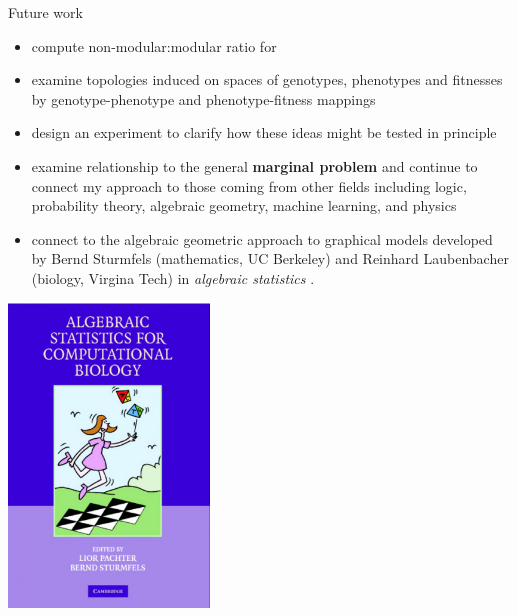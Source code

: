 \begin{frame}
\begin{footnotesize}
\begin{block}{Future work}
\begin{itemize}
\item compute non-modular:modular ratio for
\begin{enumerate}
\end{enumerate}
\item examine topologies induced on spaces of genotypes, phenotypes and fitnesses by genotype-phenotype and phenotype-fitness mappings
\item design an experiment to clarify how these ideas might be tested in principle
\item examine relationship to the general \textbf{marginal problem} and continue to connect my approach to those coming from other fields including logic, probability theory, algebraic geometry, machine learning, and physics
\item connect to the algebraic geometric approach to graphical models developed by Bernd Sturmfels (mathematics, UC Berkeley) and Reinhard Laubenbacher (biology, Virgina Tech) in \emph{algebraic statistics} \cite{PachterLior2005}.
\end{itemize}
\end{block}
\end{footnotesize}
\end{frame}

\begin{frame}
\vspace{3em}
\begin{center}
\includegraphics[width=0.4\textwidth]{fig/ASCB_Cover.jpg}
\end{center}
\end{frame}

